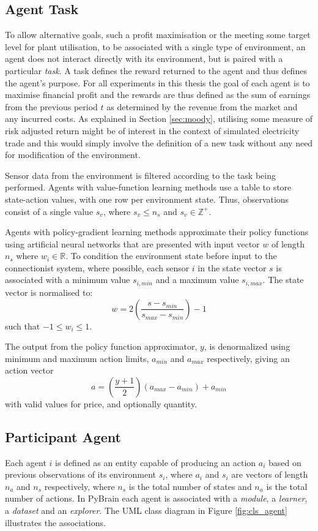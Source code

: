 \subsection{Agent Task}
To allow alternative goals, such a profit maximisation or the meeting some
target level for plant utilisation, to be associated with a single type of
environment, an agent does not interact directly with its environment, but is paired with a particular \textit{task}. A task defines the
reward returned to the agent and thus defines the agent's purpose.  For all
experiments in this thesis the goal of each agent is to maximise
financial profit and the rewards are thus defined as the sum of earnings from
the previous period $t$ as determined by the revenue from the market and any
incurred costs.  As explained in Section \ref{sec:moody}, utilising some
measure of risk adjusted return might be of interest in the context of
simulated electricity trade and this would simply involve the definition of a
new task without any need for modification of the environment.

Sensor data from the environment is filtered according to the task
being performed.  Agents with value-function learning methods use a table to
store state-action values, with one row per environment state.  Thus, observations
consist of a single value $s_v$, where $s_v \leq n_s$ and $s_v \in
\mathbb{Z}^+$.

Agents with policy-gradient learning methods approximate their policy
functions using artificial neural networks that are presented with input vector
$w$ of length $n_s$ where $w_i \in \mathbb{R}$.  To condition
the environment state before input to the connectionist system, where possible,
each sensor $i$ in the state vector $s$ is associated with a minimum value
$s_{i,min}$ and a maximum value $s_{i,max}$.   The state vector is normalised
to:
\begin{equation}
w = 2\left(\frac{s - s_{min}}{s_{max} - s_{min}}\right) - 1
\end{equation}
such that $-1 \leq w_i \leq 1$.

The output from the policy function approximator, $y$, is denormalized using
minimum and maximum action limits, $a_{min}$ and $a_{max}$ respectively, giving
an action vector
\begin{equation}
a = \left(\frac{y + 1}{2}\right)(a_{max} - a_{min}) + a_{min}
\end{equation}
with valid values for price, and optionally quantity.

\subsection{Participant Agent}
Each agent $i$ is defined as an entity capable of producing an action $a_i$
based on previous observations of its environment $s_i$, where $a_i$ and $s_i$
are vectors of length $n_a$ and $n_s$ respectively, where
$n_s$ is the total number of states and $n_a$ is the total number of actions.
In PyBrain each agent is associated with a \textit{module}, a \textit{learner},
a \textit{dataset} and an \textit{explorer}.  The UML class diagram in Figure
\ref{fig:cls_agent} illustrates the associations.

